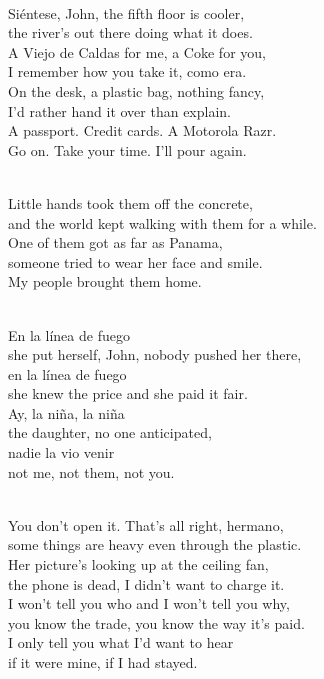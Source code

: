 \begin{lyrics}

\\
Siéntese, John, the fifth floor is cooler,\\
the river's out there doing what it does.\\
A Viejo de Caldas for me, a Coke for you,\\
I remember how you take it, como era.\\
On the desk, a plastic bag, nothing fancy,\\
I'd rather hand it over than explain.\\
A passport. Credit cards. A Motorola Razr.\\
Go on. Take your time. I'll pour again.

\\
Little hands took them off the concrete,\\
and the world kept walking with them for a while.\\
One of them got as far as Panama,\\
someone tried to wear her face and smile.\\
My people brought them home.

\\
En la línea de fuego
\\
she put herself, John, nobody pushed her there,
\\
en la línea de fuego
\\
she knew the price and she paid it fair.
\\
Ay, la niña, la niña
\\
the daughter, no one anticipated,
\\
nadie la vio venir
\\
not me, not them, not you.

\\
You don't open it. That's all right, hermano,\\
some things are heavy even through the plastic.\\
Her picture's looking up at the ceiling fan,\\
the phone is dead, I didn't want to charge it.\\
I won't tell you who and I won't tell you why,\\
you know the trade, you know the way it's paid.\\
I only tell you what I'd want to hear\\
if it were mine, if I had stayed.


\end{lyrics}
